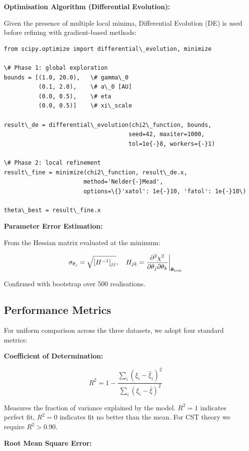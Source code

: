 \documentclass[11pt,a4paper]{article}
\begin{document}
\textbf{Optimisation Algorithm (Differential Evolution):}

Given the presence of multiple local minima, Differential Evolution (DE)
is used before refining with gradient-based methods:

\begin{lstlisting}
from scipy.optimize import differential\_evolution, minimize

\# Phase 1: global exploration
bounds = [(1.0, 20.0),   \# gamma\_0
          (0.1, 2.0),    \# a\_0 [AU]
          (0.0, 0.5),    \# eta
          (0.0, 0.5)]    \# xi\_scale

result\_de = differential\_evolution(chi2\_function, bounds,
                                    seed=42, maxiter=1000,
                                    tol=1e{-}8, workers={-}1)

\# Phase 2: local refinement
result\_fine = minimize(chi2\_function, result\_de.x,
                       method='Nelder{-}Mead',
                       options=\{}'xatol': 1e{-}10, 'fatol': 1e{-}10\)

theta\_best = result\_fine.x
\end{lstlisting}

\textbf{Parameter Error Estimation:}

From the Hessian matrix evaluated at the minimum:

\[\sigma_{\theta_j} = \sqrt{[H^{-1}]_{jj}}, \quad H_{jk} = \frac{\partial^2 \chi^2}{\partial\theta_j \partial\theta_k}\bigg|_{\boldsymbol\theta_{\rm best}}\]

Confirmed with bootstrap over 500 realisations.

\hypertarget{performance-metrics}{%
\subsection{Performance Metrics}\label{performance-metrics}}

For uniform comparison across the three datasets, we adopt four standard
metrics:

\textbf{Coefficient of Determination:}

\[R^2 = 1 - \frac{\sum_i (\xi_i - \hat\xi_i)^2}{\sum_i (\xi_i - \bar\xi)^2}\]

Measures the fraction of variance explained by the model. \(R^2 = 1\)
indicates perfect fit, \(R^2 = 0\) indicates fit no better than the
mean. For CST theory we require \(R^2 > 0.90\).

\textbf{Root Mean Square Error:}
\end{document}

